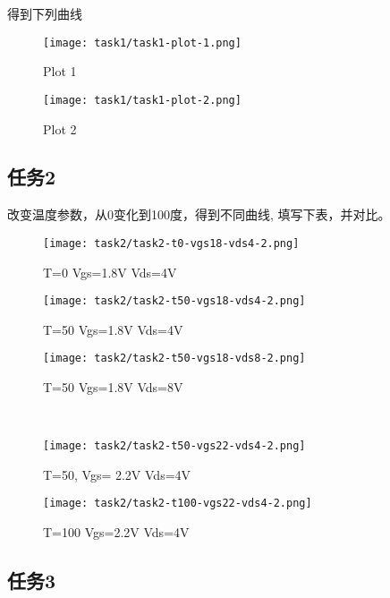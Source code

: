 \documentclass{theme-2614084}
\begin{document}
得到下列曲线

\begin{figure}[H]
  \centering
  \texttt{[image: task1/task1-plot-1.png]}
  \caption{Plot 1}
\end{figure}

\begin{figure}[H]
  \centering
  \texttt{[image: task1/task1-plot-2.png]}
  \caption{Plot 2}
\end{figure}

\subsection{任务2}

改变温度参数，从0变化到100度，得到不同曲线, 填写下表，并对比。

\begin{figure}[H]
  \centering
  \texttt{[image: task2/task2-t0-vgs18-vds4-2.png]}
  \caption{T=0 Vgs=1.8V Vds=4V}
\end{figure}

\begin{figure}[htbp]
  \centering\begin{minipage}[t]{0.48\textwidth}
    \centering\texttt{[image: task2/task2-t50-vgs18-vds4-2.png]} 
    \caption{T=50 Vgs=1.8V Vds=4V}
  \end{minipage}
  \centering\begin{minipage}[t]{0.48\textwidth}
    \centering\texttt{[image: task2/task2-t50-vgs18-vds8-2.png]}
    \caption{T=50 Vgs=1.8V Vds=8V}
  \end{minipage}
  \\
  \centering\begin{minipage}[t]{0.48\textwidth}
    \centering\texttt{[image: task2/task2-t50-vgs22-vds4-2.png]} 
    \caption{T=50, Vgs= 2.2V Vds=4V}
  \end{minipage}
  \centering\begin{minipage}[t]{0.48\textwidth}
    \centering\texttt{[image: task2/task2-t100-vgs22-vds4-2.png]}
    \caption{T=100 Vgs=2.2V Vds=4V}
  \end{minipage}
\end{figure}

\subsection{任务3}
\end{document}

